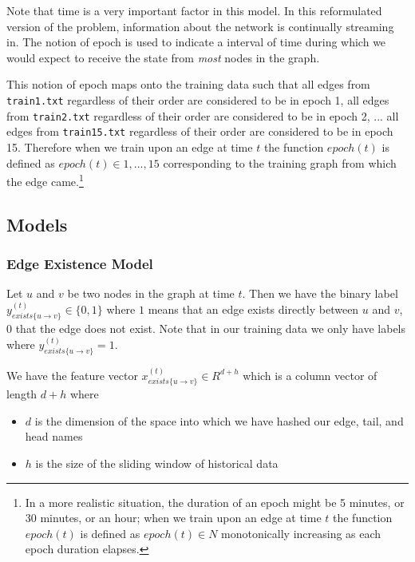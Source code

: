 \documentclass{article} %
\begin{document}
Note that time is a very important factor in this model.  In this
reformulated version of the problem, information about
the network is continually streaming in.  The notion of epoch is used to
indicate a interval of time during which we would expect to receive the
state from \emph{most} nodes in the graph.

This notion of epoch maps onto the training data such that all edges from
\texttt{train1.txt} regardless of their order are considered to be in epoch
1, all edges from \texttt{train2.txt} regardless of their order are
considered to be in epoch 2, ... all edges from \texttt{train15.txt}
regardless of their order are considered to be in epoch 15.  Therefore
when we train upon an edge at time $t$ the function $epoch(t)$ is defined as
$epoch(t) \in {1, ..., 15}$ corresponding to the training graph from which
the edge came.\footnote{In a more realistic situation, the duration of an
  epoch might be 5 minutes, or 30 minutes, or an hour; when we train upon an
  edge at time $t$ the function $epoch(t)$ is defined as $epoch(t) \in N$
  monotonically increasing as each epoch duration elapses.}

\subsection{Models}

\subsubsection{Edge Existence Model}

Let $u$ and $v$ be two nodes in the graph at time $t$.  Then we have the
binary label $y_{exists\{u \rightarrow v\}}^{(t)} \in \{0,1\}$ where $1$
means that an edge exists directly between $u$ and $v$, $0$ that the edge
does not exist.  Note that in our training data we only have labels where
$y_{exists\{u \rightarrow v\}}^{(t)} = 1$.


We have the feature vector $x_{exists\{u \rightarrow v\}}^{(t)} \in R^{d+h}$
which is a column vector of length $d+h$ where
\begin{itemize}
\item $d$ is the dimension of the space into which we have hashed our edge,
  tail, and head names
\item $h$ is the size of the sliding window of historical data
\end{itemize}
\end{document}
